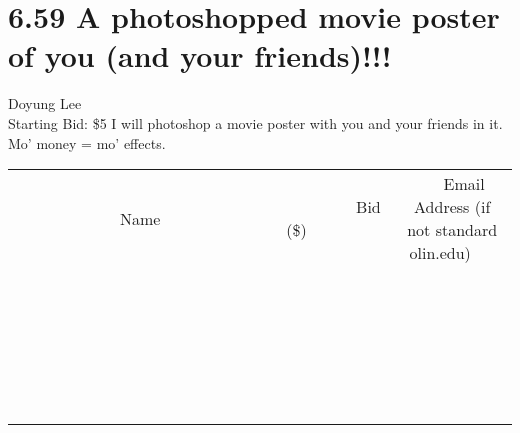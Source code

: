 \documentclass[11pt]{article}
\begin{document}
\section*{6.59 A photoshopped movie poster of you (and your friends)!!!}
Doyung Lee
\\
Starting Bid: \$5
\newline
I will photoshop a movie poster with you and your friends in it. Mo' money = mo' effects.
\\[6ex]
\begin{tabular}{c c c}
~~~~~~~~~~~~~Name~~~~~~~~~~~~~ & ~~~~~~~~~Bid (\$)~~~~~~~~~  & ~~~Email Address (if not standard olin.edu)~~~\\
 & & \\
\hline
 & & \\
\hline
 & & \\
\hline
 & & \\
\hline
 & & \\
\hline
 & & \\
\hline
 & & \\
\hline
 & & \\
\hline
 & & \\
\hline
 & & \\
\hline
 & & \\
\hline
 & & \\
\hline
 & & \\
\hline
 & & \\
\hline
 & & \\
\hline
 & & \\
\hline
 & & \\
\hline
 & & \\
\hline
 & & \\
\hline
 & & \\
\hline
 & & \\
\hline
 & & \\
\hline
 & & \\
\hline
 & & \\
\hline
 & & \\
\hline
 & & \\
\hline
\end{tabular}
\newpage
\end{document}
